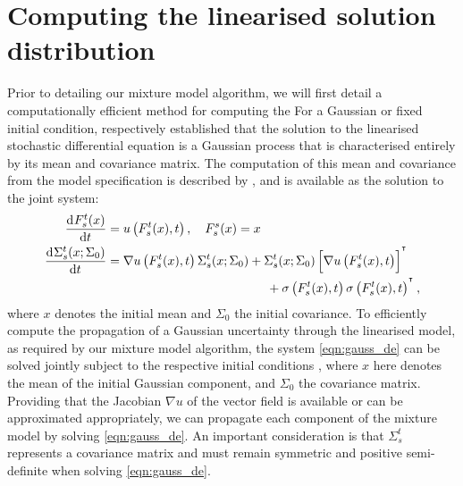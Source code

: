 \section{Computing the linearised solution distribution}\label{sec:mazzoni}
Prior to detailing our mixture model algorithm, we will first detail a computationally efficient method for computing the
For a Gaussian or fixed initial condition,  respectively established that the solution to the linearised stochastic differential equation is a Gaussian process that is characterised entirely by its mean and covariance matrix.
The computation of this mean and covariance from the model specification is described by , and is available as the solution to the joint system:
\begin{subequations}\label{eqn:gauss_de}
	\begin{align}
		\dod{F_s^t(x)}{t}                & = u\left(F_s^t(x), t\right), \quad F_s^s(x) = x \label{eqn:gauss_mean_de}                                                              \\
		\dod{\Sigma_s^t(x; \Sigma_0)}{t} & = \begin{multlined}[t]
			                                     \nabla u\left(F_s^t(x), t\right) \Sigma_s^t(x; \Sigma_0) + \Sigma_s^t(x; \Sigma_0)\left[\nabla u\left(F_s^t(x), t\right)\right]^{\T} \\
			                                     + \sigma\left(F_s^t(x), t \right)\sigma\left(F_s^t(x), t\right)^{\T},
		                                     \end{multlined}
		\label{eqn:gauss_cov_de}
	\end{align}
\end{subequations}
where \(x\) denotes the initial mean and \(\Sigma_0\) the initial covariance.
To efficiently compute the propagation of a Gaussian uncertainty through the linearised model, as required by our mixture model algorithm, the system \cref{eqn:gauss_de} can be solved jointly subject to the respective initial conditions \(\), where \(x\) here denotes the mean of the initial Gaussian component, and \(\Sigma_0\) the covariance matrix.
Providing that the Jacobian \(\nabla u\) of the vector field is available or can be approximated appropriately, we can propagate each component of the mixture model by solving \cref{eqn:gauss_de}.
An important consideration is that \(\Sigma_s^t\) represents a covariance matrix and must remain symmetric and positive semi-definite when solving \cref{eqn:gauss_de}.
